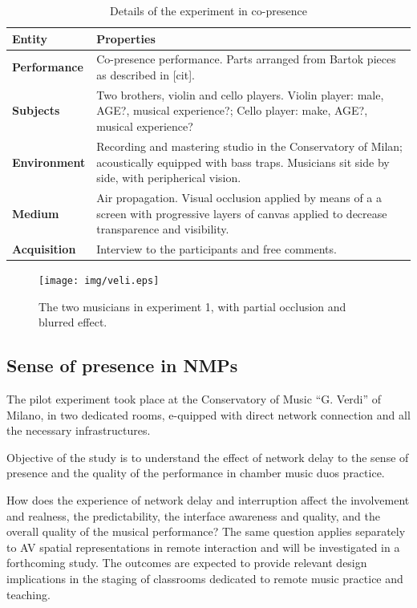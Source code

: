 \begin{table}
\centering
\label{tab:exp1}
\caption{Details of the experiment in co-presence}
\begin{tabular}{p{1.5cm}p{6cm}}
\hline
\textbf{Entity} & \textbf{Properties} \\
\hline
\textbf{Performance} & Co-presence performance. \newline Parts arranged from Bartok pieces as described in [cit]. \\
\textbf{Subjects} & Two brothers, violin and cello players. \newline Violin player: male, AGE?, musical experience?; 	\newline Cello player: make, AGE?, musical experience?\\
\textbf{Environment} & Recording and mastering studio in the Conservatory of Milan; acoustically equipped with bass traps. \newline Musicians sit side by side, with peripherical vision.\\
\textbf{Medium} & Air propagation. \newline Visual occlusion applied by means of a a screen with progressive layers of canvas applied to decrease transparence and visibility. \\
\textbf{Acquisition} & Interview to the participants and free comments.\\
\hline
\end{tabular}
\end{table}


\begin{figure}[t]
	\centering
	\texttt{[image: img/veli.eps]}
	\caption{The two musicians in experiment 1, with partial occlusion and blurred effect.}
	\label{fig:veli}
\end{figure}


\subsection{Sense of presence in NMPs}
The pilot experiment took place at the Conservatory of Music ``G. Verdi'' of Milano, in two dedicated rooms, e-quipped with direct network connection and all the necessary infrastructures.

Objective of the study is to understand the effect of network delay to the sense of presence and the quality of the performance in chamber music duos practice. 

How does the experience of network delay and interruption affect the involvement and realness, the predictability, the interface awareness and quality, and the overall quality of the musical performance? The same question applies separately to AV spatial representations in remote interaction and will be investigated in a forthcoming study. The outcomes are expected to provide relevant design implications in the staging of classrooms dedicated to remote music practice and teaching.

